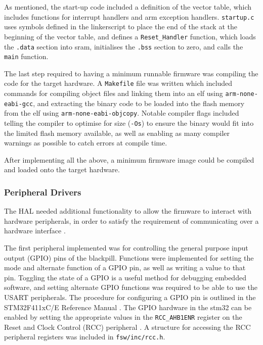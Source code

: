 \documentclass[../report.tex]{subfiles}
\begin{document}
As mentioned, the start-up code included a definition of the vector table, which
includes functions for interrupt handlers and arm exception handlers.
\lstinline|startup.c| uses symbols defined in the linkerscript to place the end
of the stack at the beginning of the vector table, and defines a
\lstinline|Reset_Handler| function, which loads the \lstinline|.data| section
into sram, initialises the \lstinline|.bss| section to zero, and calls the
\lstinline|main| function.

The last step required to having a minimum runnable firmware was compiling the
code for the target hardware. A \lstinline|Makefile| file was written which
included commands for compiling object files and linking them into an elf using
\lstinline|arm-none-eabi-gcc|, and extracting the binary code to be loaded into
the flash memory from the elf using \lstinline|arm-none-eabi-objcopy|. Notable
compiler flags included telling the compiler to optimise for size
(\lstinline|-Os|) to ensure the binary would fit into the limited flash memory
available, as well as enabling as many compiler warnings as possible to catch
errors at compile time.

After implementing all the above, a minimum firmware image could be compiled
and loaded onto the target hardware.

\subsubsection{Peripheral Drivers}

The HAL needed additional functionality to allow the firmware to interact with
hardware peripherals, in order to satisfy the requirement of communicating over
a hardware interface .

The first peripheral implemented was for controlling the general purpose input
output (GPIO) pins of the blackpill. Functions were implemented for setting the
mode and alternate function of a GPIO pin, as well as writing a value to that
pin. Toggling the state of a GPIO is a useful method for debugging embedded
software, and setting alternate GPIO functions was required to be able to use the
USART peripherals. The procedure for configuring a GPIO pin is outlined in the
STM32F411xC/E Reference Manual \citep{stm32f4_manual}. The GPIO hardware in the
stm32 can be enabled by setting the appropriate values in the
\lstinline|RCC_AHB1ENR| register on the Reset and Clock Control (RCC)
peripheral \citep{stm32f4_manual}. A structure for accessing the RCC peripheral
registers was included in \lstinline|fsw/inc/rcc.h|.
\end{document}
